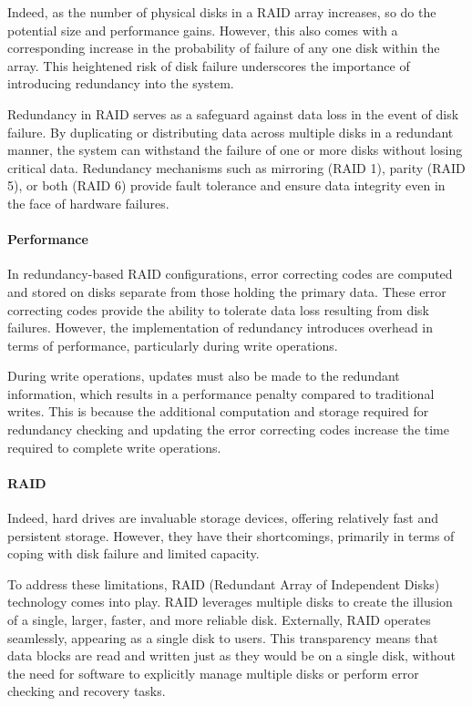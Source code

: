 Indeed, as the number of physical disks in a RAID array increases, so do the potential size and performance gains.
However, this also comes with a corresponding increase in the probability of failure of any one disk within the array. 
This heightened risk of disk failure underscores the importance of introducing redundancy into the system.

Redundancy in RAID serves as a safeguard against data loss in the event of disk failure. 
By duplicating or distributing data across multiple disks in a redundant manner, the system can withstand the failure of one or more disks without losing critical data. 
Redundancy mechanisms such as mirroring (RAID 1), parity (RAID 5), or both (RAID 6) provide fault tolerance and ensure data integrity even in the face of hardware failures.

\paragraph*{Performance}
In redundancy-based RAID configurations, error correcting codes are computed and stored on disks separate from those holding the primary data. 
These error correcting codes provide the ability to tolerate data loss resulting from disk failures. 
However, the implementation of redundancy introduces overhead in terms of performance, particularly during write operations.

During write operations, updates must also be made to the redundant information, which results in a performance penalty compared to traditional writes. 
This is because the additional computation and storage required for redundancy checking and updating the error correcting codes increase the time required to complete write operations.

\paragraph*{RAID}
Indeed, hard drives are invaluable storage devices, offering relatively fast and persistent storage. 
However, they have their shortcomings, primarily in terms of coping with disk failure and limited capacity.

To address these limitations, RAID (Redundant Array of Independent Disks) technology comes into play. 
RAID leverages multiple disks to create the illusion of a single, larger, faster, and more reliable disk.
Externally, RAID operates seamlessly, appearing as a single disk to users. 
This transparency means that data blocks are read and written just as they would be on a single disk, without the need for software to explicitly manage multiple disks or perform error checking and recovery tasks.

